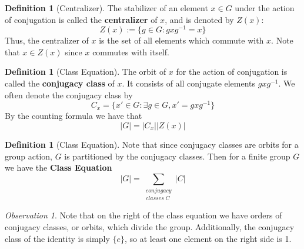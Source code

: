 \documentclass[12pt]{article}
\theoremstyle{definition}
\newtheorem{defn}[thm]{Definition}
\theoremstyle{remark}
\newtheorem{obs}[thm]{Observation}
\numberwithin{equation}{section}
\newcommand\B[1]{\textbf{ #1}}
\begin{document}
\vspace{15pt}


\begin{defn}[Centralizer]
        The stabilizer of an element $x \in G$ under the action of conjugation is called the \B{centralizer} of $x$, and is denoted by $Z(x):$ \begin{equation}
                Z(x):= \{g \in G: gxg^{-1} = x\}
        \end{equation}
        Thus, the centralizer of $x$ is the set of all elements which commute with $x$. Note that $x \in Z(x)$ since $x$ commutes with itself.
\end{defn}

\vspace{15pt}

\begin{defn}[Class Equation]
        The orbit of $x$ for the action of conjugation is called the \B{conjugacy class} of $x$. It consists of all conjugate elements $gxg^{-1}$. We often denote the conjugacy class by \begin{equation}
                C_x = \{x' \in G:\exists g\in G, x' = gxg^{-1}\}
        \end{equation}
        By the counting formula we have that \begin{equation}
                |G| = |C_x||Z(x)|
        \end{equation}
\end{defn}


\vspace{15pt}


\begin{defn}[Class Equation]
        Note that since conjugacy classes are orbits for a group action, $G$ is partitioned by the conjugacy classes. Then for a finite group $G$ we have the \B{Class Equation} \begin{equation}
        |G| = \sum\limits_{\begin{array}{c} conjugacy \\ classes\;C\end{array}}|C|
\end{equation}
\end{defn}


\vspace{15pt}


\begin{obs}
        Note that on the right of the class equation we have orders of conjugacy classes, or orbits, which divide the group. Additionally, the conjugacy class of the identity is simply $\{e\}$, so at least one element on the right side is 1.
\end{obs}
\end{document}
